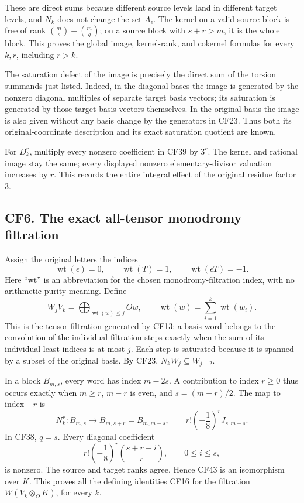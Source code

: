 \documentclass[
  10pt,
]{article}
\begin{document}
These are direct sums because different source levels land in different
target levels, and \(N_k\) does not change the set \(A_\epsilon\). The
kernel on a valid source block is free of rank \(\binom ms-\binom mq\);
on a source block with \(s+r>m\), it is the whole block. This proves the
global image, kernel-rank, and cokernel formulas for every \(k,r\),
including \(r>k\).

The saturation defect of the image is precisely the direct sum of the
torsion summands just listed. Indeed, in the diagonal bases the image is
generated by the nonzero diagonal multiples of separate target basis
vectors; its saturation is generated by those target basis vectors
themselves. In the original basis the image is also given without any
basis change by the generators in CF23. Thus both its
original-coordinate description and its exact saturation quotient are
known.

For \(D_k^r\), multiply every nonzero coefficient in CF39 by \(3^r\).
The kernel and rational image stay the same; every displayed nonzero
elementary-divisor valuation increases by \(r\). This records the entire
integral effect of the original residue factor \(3\).

\subsection{CF6. The exact all-tensor monodromy
filtration}\label{cf6.-the-exact-all-tensor-monodromy-filtration}

Assign the original letters the indices \[
 \operatorname{wt}(\epsilon)=0,\qquad
 \operatorname{wt}(T)=1,\qquad
 \operatorname{wt}(\epsilon T)=-1.
 \tag{CF41}
\] Here ``wt'' is an abbreviation for the chosen monodromy-filtration
index, with no arithmetic purity meaning. Define \[
 W_jV_k=\bigoplus_{\operatorname{wt}(w)\leq j}Ow,
 \qquad\operatorname{wt}(w)=\sum_{i=1}^k\operatorname{wt}(w_i).
 \tag{CF42}
\] This is the tensor filtration generated by CF13: a basis word belongs
to the convolution of the individual filtration steps exactly when the
sum of its individual least indices is at most \(j\). Each step is
saturated because it is spanned by a subset of the original basis. By
CF23, \(N_kW_j\subseteq W_{j-2}\).

In a block \(B_{m,s}\), every word has index \(m-2s\). A contribution to
index \(r\geq0\) thus occurs exactly when \(m\geq r\), \(m-r\) is even,
and \(s=(m-r)/2\). The map to index \(-r\) is \[
 N_k^r:B_{m,s}\longrightarrow B_{m,s+r}=B_{m,m-s},
 \qquad r!\left(-\frac18\right)^rJ_{s,m-s}.
 \tag{CF43}
\] In CF38, \(q=s\). Every diagonal coefficient \[
 r!\left(-\frac18\right)^r\binom{s+r-i}{r},
 \qquad0\leq i\leq s,
 \tag{CF44}
\] is nonzero. The source and target ranks agree. Hence CF43 is an
isomorphism over \(K\). This proves all the defining identities CF16 for
the filtration \(W(V_k\otimes_OK)\), for every \(k\).
\end{document}
